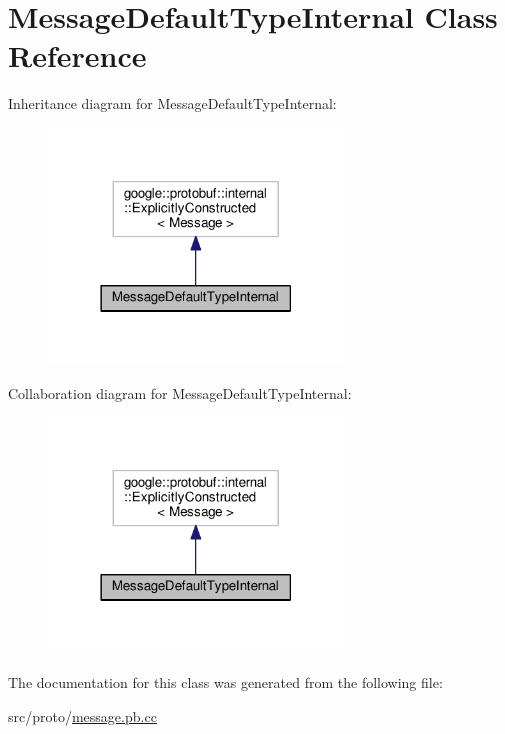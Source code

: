 \hypertarget{class_message_default_type_internal}{}\section{Message\+Default\+Type\+Internal Class Reference}
\label{class_message_default_type_internal}


Inheritance diagram for Message\+Default\+Type\+Internal\+:\nopagebreak
\begin{figure}[H]
\begin{center}
\leavevmode
\includegraphics[width=222pt]{class_message_default_type_internal__inherit__graph}
\end{center}
\end{figure}


Collaboration diagram for Message\+Default\+Type\+Internal\+:\nopagebreak
\begin{figure}[H]
\begin{center}
\leavevmode
\includegraphics[width=222pt]{class_message_default_type_internal__coll__graph}
\end{center}
\end{figure}


The documentation for this class was generated from the following file\+:\begin{DoxyCompactItemize}
\item 
src/proto/\hyperlink{message_8pb_8cc}{message.\+pb.\+cc}\end{DoxyCompactItemize}
